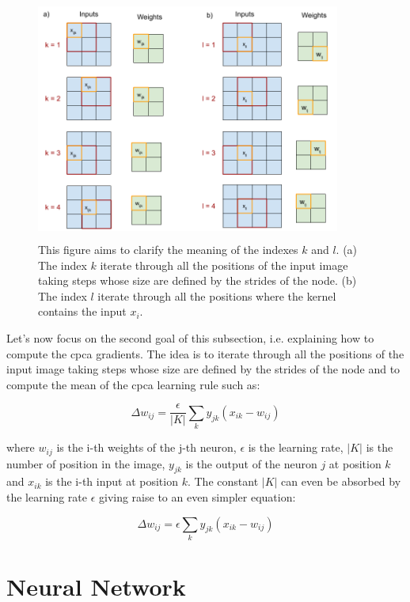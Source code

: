 \documentclass[11pt]{report}
\begin{document}
\begin{figure}[h]
\centering
\includegraphics[width=10cm, height=8cm]{k_weights_vs_inputs}
\caption{This figure aims to clarify the meaning of the indexes $k$ and $l$. (a) The index $k$ iterate through all the positions of the input image taking steps whose size are defined by the strides of the node. (b) The index $l$ iterate through all the positions where the kernel contains the input $x_i$.}
\label{k_weights_vs_inputs}
\end{figure}

\noindent Let's now focus on the second goal of this subsection, i.e. explaining how to compute the \acrshort{cpca} gradients. The idea is to iterate through all the positions of the input image taking steps whose size are defined by the strides of the node and to compute the mean of the \acrshort{cpca} learning rule such as:

\begin{equation}
\Delta w_{ij} = \frac{\epsilon}{|K|} \sum_{k} y_{jk}(x_{ik} - w_{ij})
\end{equation}

\noindent where $w_{ij}$ is the i-th weights of the j-th neuron, $\epsilon$ is the learning rate, $|K|$ is the number of position in the image, $y_{jk}$ is the output of the neuron $j$ at position $k$ and $x_{ik}$ is the i-th input at position $k$. The constant $|K|$ can even be absorbed by the learning rate $\epsilon$ giving raise to an even simpler equation:

\begin{equation}
\Delta w_{ij} = \epsilon \sum_{k} y_{jk}(x_{ik} - w_{ij})
\end{equation}

\section{Neural Network}
\end{document}
